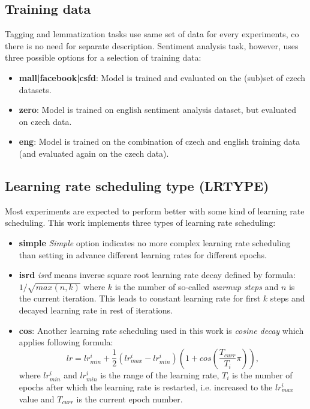 \subsection{Training data}
Tagging and lemmatization tasks use same set of data for every experiments, co there is no need for separate description. Sentiment analysis task, however, uses three possible options for a selection of training data:
\begin{itemize}
\item \textbf{mall|facebook|csfd}: Model is trained and evaluated on the (sub)set of czech datasets.
\item \textbf{zero}: Model is trained on english sentiment analysis dataset, but evaluated on czech data.
\item \textbf{eng}: Model is trained on the combination of czech and english training data (and evaluated again on the czech data). %
\end{itemize}
\subsection{Learning rate scheduling type (LRTYPE)}
Most experiments are expected to perform better with some kind of learning rate scheduling. This work implements three types of learning rate scheduling:
\begin{itemize}
\item \textbf{simple} \textit{Simple} option indicates no more complex learning rate scheduling than setting in advance different learning rates for different epochs.
\item \textbf{isrd} %
\textit{isrd} means inverse square root learning rate decay defined by formula: $1/\sqrt{max(n,k)}$ where $k$ is the number of so-called \textit{warmup steps} and $n$ is the current iteration. This leads to constant learning rate for first $k$ steps and decayed learning rate in rest of iterations.
\item \textbf{cos}: Another learning rate scheduling used in this work is \textit{cosine decay} %
which applies following formula: $$lr=lr_{min}^{i} + \frac{1}{2}(lr_{max}^{i} - lr_{min}^{i})(1+cos(\frac{T_{curr}}{T_i}\pi)),$$ where $lr_{min}^{i}$ and $lr_{min}^{i}$ is the range of the learning rate, $T_i$ is the number of epochs after which the learning rate is restarted, i.e. increased to the $lr_{max}^{i}$ value and $T_{curr}$ is the current epoch number.
\end{itemize}

